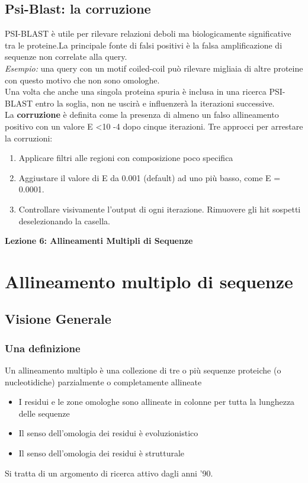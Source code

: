\documentclass{article}
\begin{document}
\subsection{Psi-Blast: la corruzione}
PSI-BLAST è utile per rilevare relazioni deboli ma
biologicamente significative tra le proteine.La principale fonte di falsi positivi è la falsa amplificazione di
sequenze non correlate alla query.\\
\textit{Esempio:} una query con un motif
coiled-coil può rilevare migliaia di
altre proteine con questo motivo che
non sono omologhe.\\
Una volta che anche una singola proteina spuria è inclusa
in una ricerca PSI-BLAST entro la soglia, non ne uscirà e influenzerà la iterazioni successive.\\
La \textbf{corruzione} è definita come la presenza di almeno un
falso allineamento positivo con un valore E <10 -4 dopo
cinque iterazioni.
Tre approcci per arrestare la corruzioni:
\begin{enumerate}
    \item Applicare filtri alle regioni con composizione poco
    specifica
    \item Aggiustare il valore di E da 0.001 (default) ad uno più
    basso, come E = 0.0001.
    \item Controllare visivamente l'output di ogni iterazione.
    Rimuovere gli hit sospetti deselezionando la casella.
\end{enumerate}

\begin{titlepage}
    \begin{center}
        \vspace*{1cm}
        \LARGE
        \textbf{Lezione 6: Allineamenti Multipli di Sequenze}

    \end{center}
\end{titlepage}
\setcounter{page}{59}
\section{Allineamento multiplo di sequenze}
\subsection{Visione Generale}
\subsubsection{Una definizione}
Un allineamento multiplo è una collezione di tre o più sequenze proteiche (o nucleotidiche) parzialmente o completamente allineate
\begin{itemize}
    \item I residui e le zone omologhe sono allineate in colonne per tutta la lunghezza delle sequenze
    \item Il senso dell'omologia dei residui è evoluzionistico
    \item Il senso dell'omologia dei residui è strutturale
\end{itemize}
Si tratta di un argomento di ricerca attivo dagli anni '90.
\end{document}
